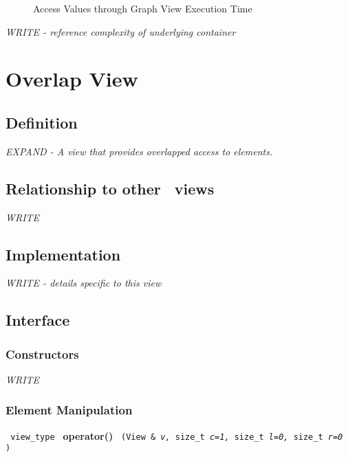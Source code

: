 \begin{figure}[p]
\caption{Access Values through Graph View Execution Time}
\label{fig:graf-vw-access-exper}
\end{figure}

\emph{WRITE - reference complexity of underlying container}


\section {Overlap View} \label{sec-over-vw}

\subsection{Definition}

\textit{EXPAND - A view that provides overlapped access to elements.}

\subsection{Relationship to other \stapl\ views}

\textit{WRITE}

\subsection{Implementation}

\textit{WRITE - details specific to this view}

\subsection{Interface} \label{sec-over-vw-inter}

\subsubsection{Constructors}

\textit{WRITE}

\subsubsection{ Element Manipulation}

\noindent
\texttt{%
view\_type
}
\newline
\textbf{operator()}%
\texttt{%
(View \&
\textit{v,}%
size\_t
\textit{c=1,}%
size\_t
\textit{l=0, }%
size\_t
\textit{r=0}%
)
}

